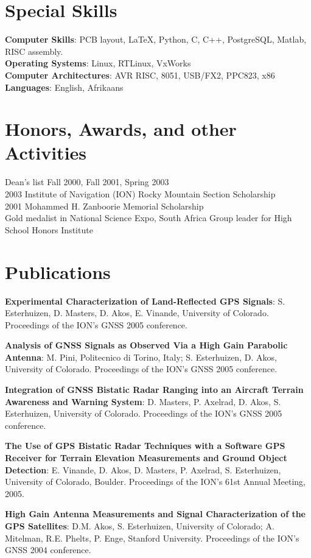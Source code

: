 \begin{resume}
\section{\sc Special Skills}
{\bf Computer Skills}: PCB layout, \LaTeX, Python, C, C++, PostgreSQL, Matlab,
	RISC assembly.\\ 
{\bf Operating Systems}: Linux, RTLinux, VxWorks\\
{\bf Computer Architectures}: AVR RISC, 8051, USB/FX2, PPC823, x86\\
{\bf Languages}: English, Afrikaans

\section{\sc Honors, Awards, and other Activities}
Dean's list Fall 2000, Fall 2001, Spring 2003\\
2003 Institute of Navigation (ION) Rocky Mountain Section Scholarship\\
2001 Mohammed H. Zanboorie Memorial Scholarship\\
Gold medalist in National Science Expo, South Africa
Group leader for High School Honors Institute

\section{\sc Publications}
{\bf Experimental Characterization of Land-Reflected GPS Signals}: S. Esterhuizen, D. Masters, D. Akos, E. Vinande, University of Colorado. Proceedings of the ION's GNSS 2005 conference.

{\bf Analysis of GNSS Signals as Observed Via a High Gain Parabolic Antenna}: M. Pini, Politecnico di Torino, Italy; S. Esterhuizen, D. Akos, University of Colorado. Proceedings of the ION's GNSS 2005 conference.

{\bf Integration of GNSS Bistatic Radar Ranging into an Aircraft Terrain Awareness and Warning System}: D. Masters, P. Axelrad, D. Akos, S. Esterhuizen, University of Colorado. Proceedings of the ION's GNSS 2005 conference.

{\bf The Use of GPS Bistatic Radar Techniques with a Software GPS Receiver for Terrain Elevation Measurements and Ground Object Detection}: E. Vinande, D. Akos, D. Masters, P. Axelrad, S. Esterhuizen, University of Colorado, Boulder. Proceedings of the ION's 61st Annual Meeting, 2005.

{\bf High Gain Antenna Measurements and Signal Characterization of the GPS Satellites}: D.M. Akos, S. Esterhuizen, University of Colorado; A. Mitelman, R.E. Phelts, P. Enge, Stanford University. Proceedings of the ION's GNSS 2004 conference.
\end{resume}

